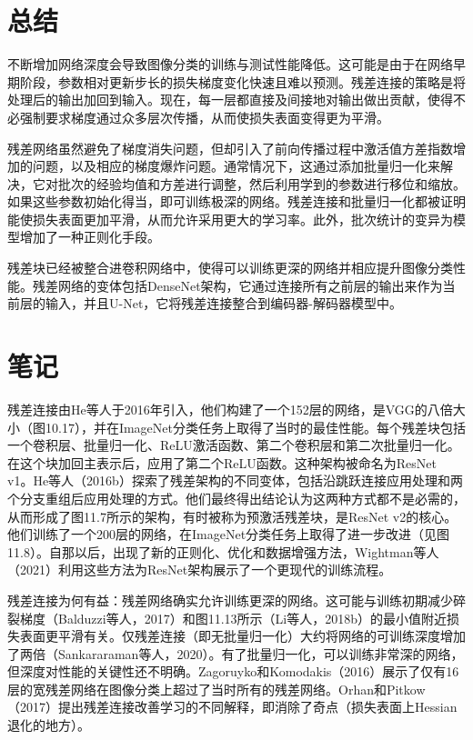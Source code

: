 \section{总结}
不断增加网络深度会导致图像分类的训练与测试性能降低。这可能是由于在网络早期阶段，参数相对更新步长的损失梯度变化快速且难以预测。残差连接的策略是将处理后的输出加回到输入。现在，每一层都直接及间接地对输出做出贡献，使得不必强制要求梯度通过众多层次传播，从而使损失表面变得更为平滑。

残差网络虽然避免了梯度消失问题，但却引入了前向传播过程中激活值方差指数增加的问题，以及相应的梯度爆炸问题。通常情况下，这通过添加批量归一化来解决，它对批次的经验均值和方差进行调整，然后利用学到的参数进行移位和缩放。如果这些参数初始化得当，即可训练极深的网络。残差连接和批量归一化都被证明能使损失表面更加平滑，从而允许采用更大的学习率。此外，批次统计的变异为模型增加了一种正则化手段。

残差块已经被整合进卷积网络中，使得可以训练更深的网络并相应提升图像分类性能。残差网络的变体包括DenseNet架构，它通过连接所有之前层的输出来作为当前层的输入，并且U-Net，它将残差连接整合到编码器-解码器模型中。

\section{笔记}
残差连接由He等人于2016年引入，他们构建了一个152层的网络，是VGG的八倍大小（图10.17），并在ImageNet分类任务上取得了当时的最佳性能。每个残差块包括一个卷积层、批量归一化、ReLU激活函数、第二个卷积层和第二次批量归一化。在这个块加回主表示后，应用了第二个ReLU函数。这种架构被命名为ResNet v1。He等人（2016b）探索了残差架构的不同变体，包括沿跳跃连接应用处理和两个分支重组后应用处理的方式。他们最终得出结论认为这两种方式都不是必需的，从而形成了图11.7所示的架构，有时被称为预激活残差块，是ResNet v2的核心。他们训练了一个200层的网络，在ImageNet分类任务上取得了进一步改进（见图11.8）。自那以后，出现了新的正则化、优化和数据增强方法，Wightman等人（2021）利用这些方法为ResNet架构展示了一个更现代的训练流程。

残差连接为何有益：残差网络确实允许训练更深的网络。这可能与训练初期减少碎裂梯度（Balduzzi等人，2017）和图11.13所示（Li等人，2018b）的最小值附近损失表面更平滑有关。仅残差连接（即无批量归一化）大约将网络的可训练深度增加了两倍（Sankararaman等人，2020）。有了批量归一化，可以训练非常深的网络，但深度对性能的关键性还不明确。Zagoruyko和Komodakis（2016）展示了仅有16层的宽残差网络在图像分类上超过了当时所有的残差网络。Orhan和Pitkow（2017）提出残差连接改善学习的不同解释，即消除了奇点（损失表面上Hessian退化的地方）。


